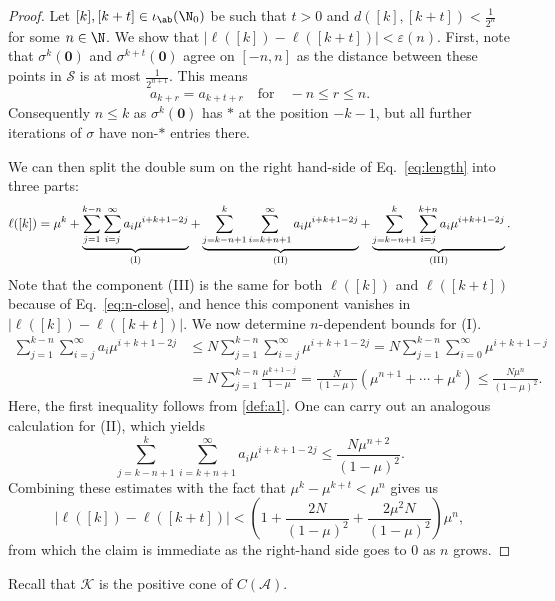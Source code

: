 \begin{proof}
Let $[k],[k+t]\in \iota_{\ab}(\N_0)$ be such that $t>0$ and 
$d([k],[k+t])<\frac{1}{2^{n}}$ for some $n\in\N$. We show that $|\ell([k])-\ell([k+t])|<\varepsilon(n)$. First, note that $\sigma^{k}(\mathbf{0})$ and $\sigma^{k+t}(\mathbf{0})$ agree on $[-n,n]$ as the distance between these points in $\mathcal S$ is at most $\frac{1}{2^{n+1}}$. This means 
\begin{equation}\label{eq:n-close}
a_{k+r}=a_{k+t+r} \quad\text{for}\quad -n\leqslant r\leqslant n.
\end{equation} 
Consequently $n\leqslant k$ as $\sigma^k(\mathbf{0})$ has $*$ at the position $-k-1$, but all further iterations of $\sigma$ have non-$*$ entries there.


We can then split the double sum on the right hand-side of Eq.~\eqref{eq:length} into three parts:
\[
\ell([k])=\mu^k+\underbrace{\sum_{j=1}^{k-n}\sum_{i=j}^\infty a_i\mu^{i+k+1-2j}}_{\textnormal{(I)}}+\underbrace{\sum_{j=k-n+1}^k\sum_{i=k+n+1}^\infty a_i\mu^{i+k+1-2j}}_{\textnormal{(II)}}+\underbrace{\sum_{j=k-n+1}^k\sum_{i=j}^{k+n} a_i\mu^{i+k+1-2j}}_{\textnormal{(III)}}.
\]
Note that the component (III) is the same for both $\ell([k])$ and $\ell([k+t])$ because of Eq.~\eqref{eq:n-close}, and hence this component vanishes in $|\ell([k])-\ell([k+t])|$.
We now determine $n$-dependent bounds for (I). 
\begin{align*}
\sum_{j=1}^{k-n}\sum_{i=j}^\infty a_i\mu^{i+k+1-2j}& \leqslant N \sum_{j=1}^{k-n}\sum_{i=j}^\infty \mu^{i+k+1-2j}= N \sum_{j=1}^{k-n}\sum_{i=0}^\infty \mu^{i+k+1-j}\\
&=N \sum_{j=1}^{k-n} \frac{\mu^{k+1-j}}{1-\mu}=\frac{N}{(1-\mu)}(\mu^{n+1}+\cdots+ \mu^k)\leqslant \frac{N\mu^n}{(1-\mu)^2}.
\end{align*}
Here, the first inequality follows from \ref{def:a1}. One can carry out an analogous calculation for (II), which yields
\[
\sum_{j=k-n+1}^{k}\sum_{i=k+n+1}^\infty a_i\mu^{i+k+1-2j}\leqslant \frac{N\mu^{n+2}}{(1-\mu)^2}.
\]
Combining these estimates with the fact that $\mu^{k}-\mu^{k+t}< \mu^n$ gives us
\[
\left|\ell([k])-\ell([k+t])\right|<\left(1+\frac{2N}{(1-\mu)^2}+\frac{2\mu^2 N}{(1-\mu)^2}\right)\mu^n,
\]
from which the claim is immediate as the right-hand side goes to 0 as $n$ grows.
\end{proof}



Recall that $\mathcal{K}$ is the positive cone of $C(\mathcal{A})$. 



